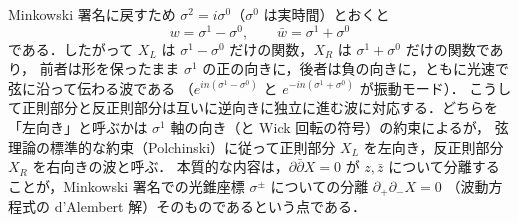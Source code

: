 Minkowski 署名に戻すため $\sigma^2=i\sigma^0$（$\sigma^0$ は実時間）とおくと
\begin{equation*}
  w=\sigma^1-\sigma^0,\qquad \bar w=\sigma^1+\sigma^0
\end{equation*}
である．したがって $X_L$ は $\sigma^1-\sigma^0$ だけの関数，$X_R$ は $\sigma^1+\sigma^0$ だけの関数であり，
前者は形を保ったまま $\sigma^1$ の正の向きに，後者は負の向きに，ともに光速で弦に沿って伝わる波である
（$e^{in(\sigma^1-\sigma^0)}$ と $e^{-in(\sigma^1+\sigma^0)}$ が振動モード）．
こうして正則部分と反正則部分は互いに逆向きに独立に進む波に対応する．どちらを「左向き」と呼ぶかは $\sigma^1$ 軸の向き（と Wick 回転の符号）の約束によるが，
弦理論の標準的な約束（Polchinski）に従って正則部分 $X_L$ を左向き，反正則部分 $X_R$ を右向きの波と呼ぶ．
本質的な内容は，$\partial\bar\partial X=0$ が $z,\bar z$ について分離することが，Minkowski 署名での光錐座標 $\sigma^\pm$ についての分離 $\partial_+\partial_-X=0$
（波動方程式の d'Alembert 解）そのものであるという点である．
